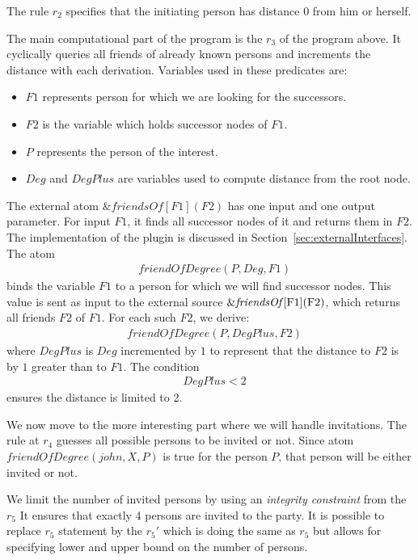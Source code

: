 \documentclass[14pt,a4paper, titlepage]{article}
\newcommand{\ext}[3]{\ensuremath{\&{#1}[#2](#3)}}
\begin{document}
The rule $r_2$ specifies that the initiating person has 
distance 0 from him or herself. 

The main computational part of the program is the $r_3$ of 
the program above. It cyclically queries all  friends of 
already known persons and increments the distance with each 
derivation. Variables used in these predicates are: 

\begin{itemize}
\item $\mathit{F1}$ represents person for which we are 
looking for the successors.

\item $\mathit{F2}$ is the variable which holds successor 
nodes of $F1$. 

\item $P$ represents the person of the interest.

\item $\mathit{Deg}$ and $DegPlus$ are variables used to 
compute distance from the root node.
\end{itemize}
The external atom \ext{friendsOf}{F1}{F2} has one input and 
one output parameter. For input $\mathit{F1}$, 
it finds all successor nodes of it and returns them in 
$\mathit{F2}$. The implementation of the plugin is 
discussed in Section~\ref{sec:externalInterfaces}. The atom
\begin{align*}
& \mathit{friendOfDegree(P, Deg, F1)}
\end{align*}
binds the variable $\mathit{F1}$ to a person for which we 
will find successor nodes. This value is sent as input to 
the external source \ext{\mathit{friendsOf}}{$F1$}{$F2$}, 
which returns all friends $F2$ of $F1$. For each such $F2$, 
we derive:
\begin{align*}
& \mathit{friendOfDegree(P, DegPlus, F2)}
\end{align*} 
where $\mathit{DegPlus}$ is $\mathit{Deg}$ incremented by 
$1$ to represent that the distance to $F2$ is by $1$ 
greater than to $F1$. The condition
\begin{align*}
& \mathit{DegPlus < 2}
\end{align*}
ensures the distance is limited to 2. 

We now move to the more interesting part where we will 
handle invitations. The rule at $r_4$ guesses all possible 
persons to be invited or not. Since atom 
$\mathit{friendOfDegree(john, X, P)}$ is true for the 
person $P$, that person will be either invited or not.

We limit the number of invited persons by using an 
\emph{integrity constraint} from the $r_5$
It ensures that exactly 4 persons are invited to the party. 
It is possible to replace $r_5$ statement by the $r_5 
\prime $
which is doing the same as $r_5$ but allows for specifying 
lower and upper bound on the number of persons.
  
\end{document}
